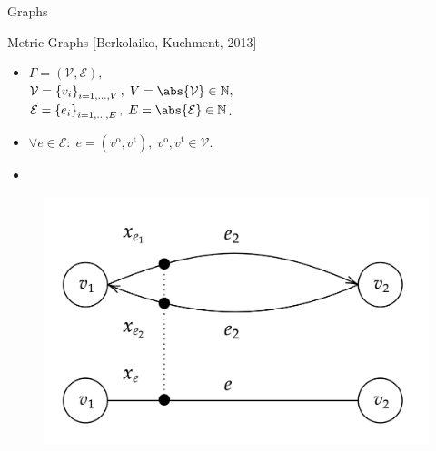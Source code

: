 \documentclass[9pt]{beamer}
\begin{document}
\begin{frame}{Graphs}
\begin{minipage}{0.45\textwidth}
\begin{figure}[H]
{
          }
      \end{figure}
  \end{minipage}
\end{frame}

\begin{frame}{Metric Graphs}
    \vspace{-1\baselineskip}\hfill{\tiny{[Berkolaiko, Kuchment, 2013]}} \\
    \begin{minipage}{0.5\textwidth}
        \begin{itemize}
            \item $\Gamma = \left(\mathcal{V}, \mathcal{E} \right),$ \\ $\mathcal{V} = \left\{ v_i \right\}_{i = 1, \ldots, V}, \; V = \abs{\mathcal{V}} \in \mathbb{N},$ \\
            $\mathcal{E} = \left\{ e_i \right\}_{i = 1, \ldots, E}, \; E = \abs{\mathcal{E}} \in \mathbb{N}$.
            \item $\forall e \in \mathcal{E} \colon \; e = (v^{\operatorname{o}}, v^{\operatorname{t}}), \;v^{\operatorname{o}}, v^{\operatorname{t}} \in \mathcal{V}$.
            \item 
        \end{itemize}
    \end{minipage} \hfill
    \begin{minipage}{0.45\textwidth}
        \begin{figure}[H]
            \includegraphics[scale=0.15]{img/diagram-20220315.png}
        \end{figure}
    \end{minipage}
  \end{frame}
\end{document}
